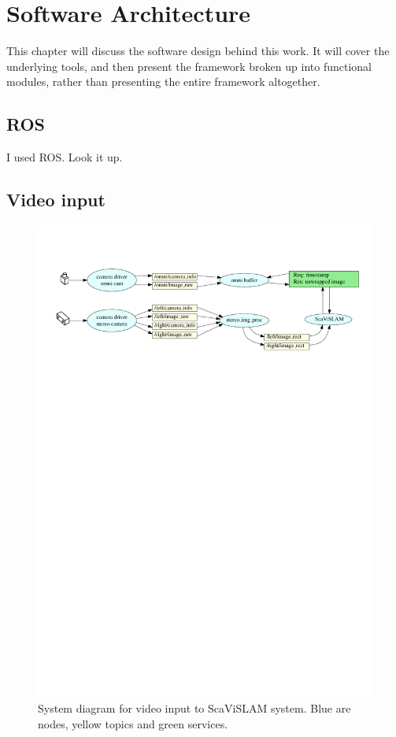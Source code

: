 \chapter{Software Architecture}
\label{chapter:architecture}

This chapter will discuss the software design behind this work.  It will cover the underlying tools, and then present the framework broken up into functional modules, rather than presenting the entire framework altogether.

\section{ROS}

I used ROS.  Look it up.

\section{Video input}

\begin{figure}[H]
  \centering
    \includegraphics[width=1.1\textwidth]{chapters/images/input_architecture}
  \caption{System diagram for video input to ScaViSLAM system.  Blue are nodes, yellow topics and green services.}
  \label{fig:input_architecture}
\end{figure}

